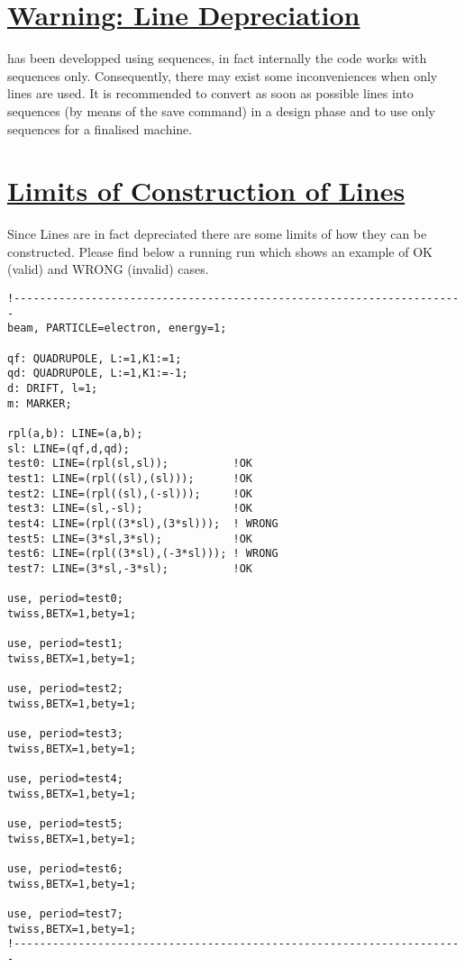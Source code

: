 \section{\href{Line_Depreciation}{Warning: Line Depreciation}} 
\madx has been developped using sequences, in fact internally the code
works with sequences only. Consequently, there may exist some
inconveniences when only lines are used. It is recommended to convert as
soon as possible lines into sequences (by means of the save command) in
a design phase and to use only sequences for a finalised machine.    

\section{\href{Line_Limits}{ Limits of Construction of Lines}}  
Since Lines are in fact depreciated there are some limits of how they
can be constructed. Please find below a running \madx run which shows an
example of OK (valid) and WRONG (invalid) cases.   

\begin{verbatim}
!----------------------------------------------------------------------
beam, PARTICLE=electron, energy=1;

qf: QUADRUPOLE, L:=1,K1:=1;
qd: QUADRUPOLE, L:=1,K1:=-1;
d: DRIFT, l=1;
m: MARKER;

rpl(a,b): LINE=(a,b);
sl: LINE=(qf,d,qd);
test0: LINE=(rpl(sl,sl));          !OK 
test1: LINE=(rpl((sl),(sl)));      !OK
test2: LINE=(rpl((sl),(-sl)));     !OK
test3: LINE=(sl,-sl);              !OK
test4: LINE=(rpl((3*sl),(3*sl)));  ! WRONG
test5: LINE=(3*sl,3*sl);           !OK
test6: LINE=(rpl((3*sl),(-3*sl))); ! WRONG
test7: LINE=(3*sl,-3*sl);          !OK

use, period=test0;
twiss,BETX=1,bety=1;

use, period=test1;
twiss,BETX=1,bety=1;

use, period=test2;
twiss,BETX=1,bety=1;

use, period=test3;
twiss,BETX=1,bety=1;

use, period=test4;
twiss,BETX=1,bety=1;

use, period=test5;
twiss,BETX=1,bety=1;

use, period=test6;
twiss,BETX=1,bety=1;

use, period=test7;
twiss,BETX=1,bety=1;
!----------------------------------------------------------------------
\end{verbatim}


